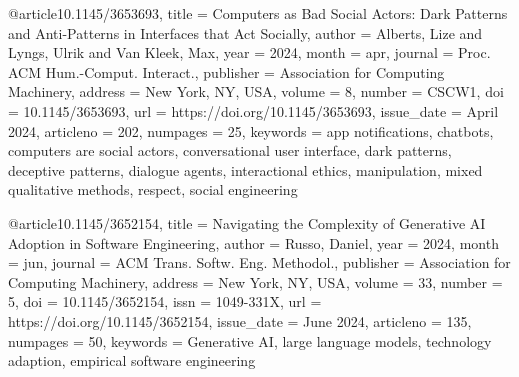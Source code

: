 @article{10.1145/3653693,
title = {Computers as Bad Social Actors: Dark Patterns and Anti-Patterns in Interfaces that Act Socially},
author = {Alberts, Lize and Lyngs, Ulrik and Van Kleek, Max},
year = 2024,
month = {apr},
journal = {Proc. ACM Hum.-Comput. Interact.},
publisher = {Association for Computing Machinery},
address = {New York, NY, USA},
volume = 8,
number = {CSCW1},
doi = {10.1145/3653693},
url = {https://doi.org/10.1145/3653693},
issue_date = {April 2024},
articleno = 202,
numpages = 25,
keywords = {app notifications, chatbots, computers are social actors, conversational user interface, dark patterns, deceptive patterns, dialogue agents, interactional ethics, manipulation, mixed qualitative methods, respect, social engineering}
}

@article{10.1145/3652154,
title = {Navigating the Complexity of Generative AI Adoption in Software Engineering},
author = {Russo, Daniel},
year = 2024,
month = {jun},
journal = {ACM Trans. Softw. Eng. Methodol.},
publisher = {Association for Computing Machinery},
address = {New York, NY, USA},
volume = 33,
number = 5,
doi = {10.1145/3652154},
issn = {1049-331X},
url = {https://doi.org/10.1145/3652154},
issue_date = {June 2024},
articleno = 135,
numpages = 50,
keywords = {Generative AI, large language models, technology adaption, empirical software engineering}
}

